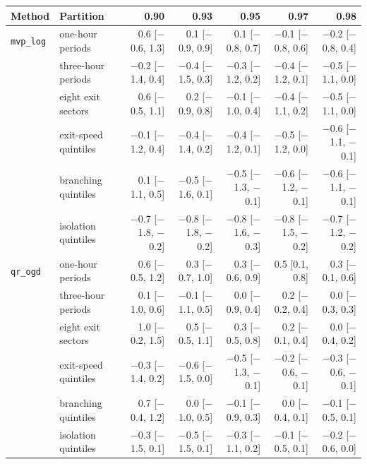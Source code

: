 \setlength{\tabcolsep}{3.4pt}
\begin{tabular}{@{}llrrrrr@{}}
\toprule
Method & Partition & 0.90 & 0.93 & 0.95 & 0.97 & 0.98 \\
\midrule
\texttt{mvp\_log} & one-hour periods & 0.6 [$-$0.6, 1.3] & 0.1 [$-$0.9, 0.9] & 0.1 [$-$0.8, 0.7] & $-$0.1 [$-$0.8, 0.6] & $-$0.2 [$-$0.8, 0.4] \\
 & three-hour periods & $-$0.2 [$-$1.4, 0.4] & $-$0.4 [$-$1.5, 0.3] & $-$0.3 [$-$1.2, 0.2] & $-$0.4 [$-$1.2, 0.1] & $-$0.5 [$-$1.1, 0.0] \\
 & eight exit sectors & 0.6 [$-$0.5, 1.1] & 0.2 [$-$0.9, 0.8] & $-$0.1 [$-$1.0, 0.4] & $-$0.4 [$-$1.1, 0.2] & $-$0.5 [$-$1.1, 0.0] \\
 & exit-speed quintiles & $-$0.1 [$-$1.2, 0.4] & $-$0.4 [$-$1.4, 0.2] & $-$0.4 [$-$1.2, 0.1] & $-$0.5 [$-$1.2, 0.0] & $-$0.6 [$-$1.1, $-$0.1] \\
 & branching quintiles & 0.1 [$-$1.1, 0.5] & $-$0.5 [$-$1.6, 0.1] & $-$0.5 [$-$1.3, $-$0.1] & $-$0.6 [$-$1.2, $-$0.1] & $-$0.6 [$-$1.1, $-$0.1] \\
 & isolation quintiles & $-$0.7 [$-$1.8, $-$0.2] & $-$0.8 [$-$1.8, $-$0.2] & $-$0.8 [$-$1.6, $-$0.3] & $-$0.8 [$-$1.5, $-$0.2] & $-$0.7 [$-$1.2, $-$0.2] \\
\addlinespace[2pt]
\texttt{qr\_ogd} & one-hour periods & 0.6 [$-$0.5, 1.2] & 0.3 [$-$0.7, 1.0] & 0.3 [$-$0.6, 0.9] & 0.5 [0.1, 0.8] & 0.3 [$-$0.1, 0.6] \\
 & three-hour periods & 0.1 [$-$1.0, 0.6] & $-$0.1 [$-$1.1, 0.5] & 0.0 [$-$0.9, 0.4] & 0.2 [$-$0.2, 0.4] & 0.0 [$-$0.3, 0.3] \\
 & eight exit sectors & 1.0 [$-$0.2, 1.5] & 0.5 [$-$0.5, 1.1] & 0.3 [$-$0.5, 0.8] & 0.2 [$-$0.1, 0.4] & 0.0 [$-$0.4, 0.2] \\
 & exit-speed quintiles & $-$0.3 [$-$1.4, 0.2] & $-$0.6 [$-$1.5, 0.0] & $-$0.5 [$-$1.3, $-$0.1] & $-$0.2 [$-$0.6, $-$0.1] & $-$0.3 [$-$0.6, $-$0.1] \\
 & branching quintiles & 0.7 [$-$0.4, 1.2] & 0.0 [$-$1.0, 0.5] & $-$0.1 [$-$0.9, 0.3] & 0.0 [$-$0.4, 0.1] & $-$0.1 [$-$0.5, 0.1] \\
 & isolation quintiles & $-$0.3 [$-$1.5, 0.1] & $-$0.5 [$-$1.5, 0.1] & $-$0.3 [$-$1.1, 0.2] & $-$0.1 [$-$0.5, 0.1] & $-$0.2 [$-$0.6, 0.0] \\
\bottomrule
\end{tabular}
